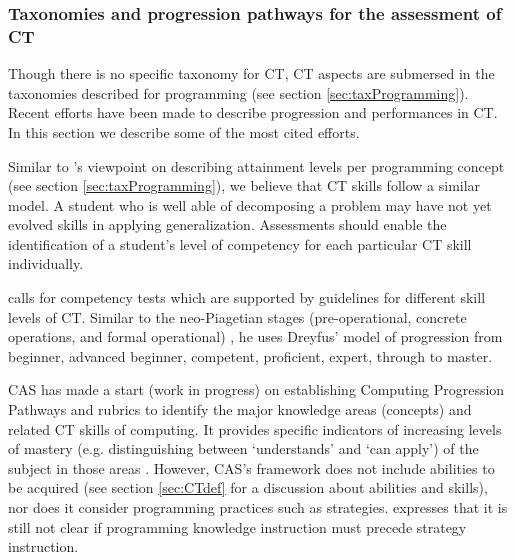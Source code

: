 \subsubsection{Taxonomies and progression pathways for the assessment of CT}
Though there is no specific taxonomy for CT, CT aspects are submersed in the taxonomies described for programming (see section \ref{sec:taxProgramming}). Recent efforts have been made to describe progression and performances in CT. In this section we describe some of the most cited efforts.




Similar to 's viewpoint on describing attainment levels per programming concept (see section \ref{sec:taxProgramming}), we believe that CT skills follow a similar model. A student who is well able of decomposing a problem may have not yet evolved skills in applying generalization. Assessments should enable the identification of a student's level of competency for each particular CT skill individually.


 calls for competency tests which are supported by guidelines for different skill levels of CT. Similar to the neo-Piagetian stages (pre-operational, concrete operations, and formal operational) \cite{szabo2014neo}, he uses Dreyfus' model of progression from beginner, advanced beginner, competent, proficient, expert, through to master.

CAS has made a start (work in progress) on establishing Computing Progression Pathways and rubrics \cite{Dorling2014CTprogressions} to identify the major knowledge areas (concepts) and related CT skills of computing. It provides specific indicators of increasing levels of mastery (e.g. distinguishing between ‘understands’ and ‘can apply’) of the subject in those areas \cite{Giordano2015}. However, CAS's framework does not include abilities to be acquired \cite{denning2017remaining} (see section \ref{sec:CTdef} for a discussion about abilities and skills), nor does it consider programming practices such as strategies.  expresses that it is still not clear if programming knowledge instruction must precede strategy instruction.


